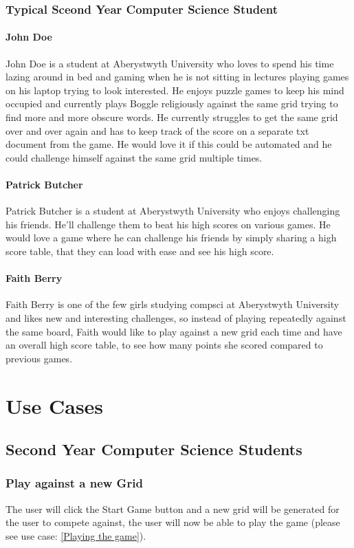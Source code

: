 \documentclass{project}
\begin{document}
	\subsubsection{Typical Sceond Year Computer Science Student}
		\paragraph{John Doe}
			John Doe is a student at Aberystwyth University who loves to spend his time lazing around in bed and gaming when he is not sitting in lectures playing games on his laptop trying to look interested. He enjoys puzzle games to keep his mind occupied and currently plays Boggle religiously against the same grid trying to find more and more obscure words. He currently struggles to get the same grid over and over again and has to keep track of the score on a separate txt document from the game. He would love it if this could be automated and he could challenge himself against the same grid multiple times.
		\paragraph{Patrick Butcher}
			Patrick Butcher is a student at Aberystwyth University who enjoys challenging his friends. He'll challenge them to beat his high scores on various games. He would love a game where he can challenge his friends by simply sharing a high score table, that they can load with ease and see his high score.
		\paragraph{Faith Berry}
			Faith Berry is one of the few girls studying compsci at Aberystwyth University and likes new and interesting challenges, so instead of playing repeatedly against the same board, Faith would like to play against a new grid each time and have an overall high score table, to see how many points she scored compared to previous games.
	
	

\section{Use Cases}
	\subsection{Second Year Computer Science Students}
		\subsubsection{Play against a new Grid}
			The user will click the Start Game button and a new grid will be generated for 	the user to compete against, the user will now be able to play the game (please see use case: \ref{Playing the game}).
\end{document}
